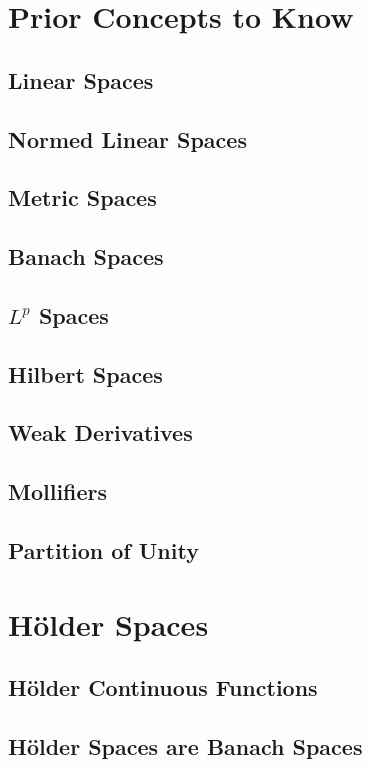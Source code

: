 \documentclass[11pt]{article}
\theoremstyle{definition}
\begin{document}
\pagestyle{fancy}
\fancyhead[L]{}
\fancyhead[R]{}
\tableofcontents
\newpage
\fancyhead[L]{\leftmark}
\fancyhead[R]{\rightmark}
\fancyhead[C]{}
\section{Prior Concepts to Know}
\subsection{Linear Spaces}
\subsection{Normed Linear Spaces}
\subsection{Metric Spaces}
\subsection{Banach Spaces}
\subsection{$L^p$ Spaces}
\subsection{Hilbert Spaces}
\subsection{Weak Derivatives}
\subsection{Mollifiers}
\subsection{Partition of Unity}

\newpage

\section{H\"{o}lder Spaces}
\subsection{H\"{o}lder Continuous Functions}
\subsection{H\"{o}lder Spaces are Banach Spaces}
\end{document}
